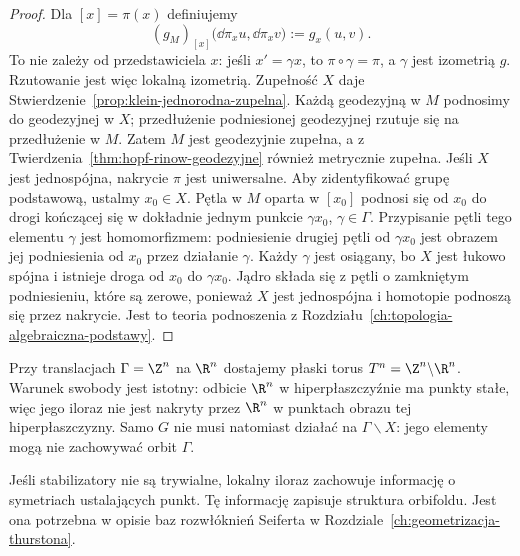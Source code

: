 \begin{proof}
Dla $[x]=\pi(x)$ definiujemy
\[
 (g_M)_{[x]}\bigl(\dd\pi_x u,\dd\pi_x v\bigr)
 :=g_x(u,v).
\]
To nie zależy od przedstawiciela $x$: jeśli $x'=\gamma x$,
to $\pi\circ\gamma=\pi$, a $\gamma$ jest izometrią $g$.
Rzutowanie jest więc lokalną izometrią.
Zupełność $X$ daje
Stwierdzenie~\ref{prop:klein-jednorodna-zupelna}.
Każdą geodezyjną w $M$ podnosimy do geodezyjnej w $X$;
przedłużenie podniesionej geodezyjnej rzutuje się na
przedłużenie w $M$. Zatem $M$ jest geodezyjnie zupełna,
a z Twierdzenia~\ref{thm:hopf-rinow-geodezyjne} również
metrycznie zupełna. Jeśli $X$ jest jednospójna, nakrycie
$\pi$ jest uniwersalne. Aby zidentyfikować grupę podstawową,
ustalmy $x_0\in X$. Pętla w $M$ oparta w $[x_0]$ podnosi się
od $x_0$ do drogi kończącej się w dokładnie jednym punkcie
$\gamma x_0$, $\gamma\in\Gamma$. Przypisanie pętli tego
elementu $\gamma$ jest homomorfizmem: podniesienie drugiej
pętli od $\gamma x_0$ jest obrazem jej podniesienia od $x_0$
przez działanie $\gamma$. Każdy $\gamma$ jest osiągany, bo
$X$ jest łukowo spójna i istnieje droga od $x_0$ do
$\gamma x_0$. Jądro składa się z pętli o zamkniętym
podniesieniu, które są zerowe, ponieważ $X$ jest jednospójna
i homotopie podnoszą się przez nakrycie. Jest to teoria
podnoszenia z Rozdziału~\ref{ch:topologia-algebraiczna-podstawy}.
\end{proof}

Przy translacjach $\Gamma=\Z^n$ na $\R^n$ dostajemy płaski
torus $T^n=\Z^n\backslash\R^n$. Warunek swobody jest istotny:
odbicie $\R^n$ w hiperpłaszczyźnie ma punkty stałe, więc jego
iloraz nie jest nakryty przez $\R^n$ w punktach obrazu tej
hiperpłaszczyzny. Samo $G$ nie musi natomiast działać na
$\Gamma\backslash X$: jego elementy mogą nie zachowywać
orbit $\Gamma$.

Jeśli stabilizatory nie są trywialne, lokalny iloraz zachowuje
informację o symetriach ustalających punkt. Tę informację zapisuje
struktura orbifoldu. Jest ona potrzebna w opisie baz rozwłóknień
Seiferta w Rozdziale~\ref{ch:geometrizacja-thurstona}.

